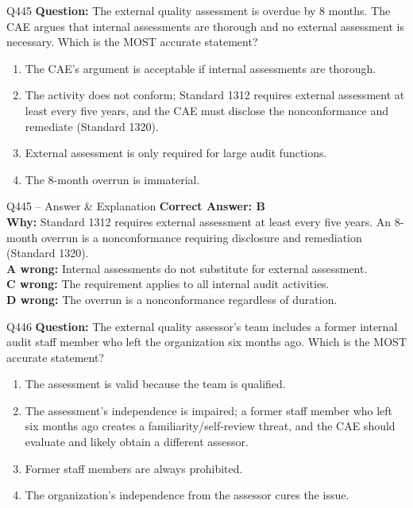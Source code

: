 \documentclass[aspectratio=169,10pt]{beamer}
\begin{document}
	\begin{frame}[t]{Q445}
		\small
		\textbf{Question:} The external quality assessment is overdue by 8 months. The CAE argues that internal assessments are thorough and no external assessment is necessary. Which is the MOST accurate statement?
		\begin{enumerate}[label=\Alph*.,itemsep=1pt,topsep=2pt]
			\item The CAE's argument is acceptable if internal assessments are thorough.
			\item The activity does not conform; Standard 1312 requires external assessment at least every five years, and the CAE must disclose the nonconformance and remediate (Standard 1320).
			\item External assessment is only required for large audit functions.
			\item The 8-month overrun is immaterial.
		\end{enumerate}
	\end{frame}
	
	\begin{frame}[t]{Q445 -- Answer \& Explanation}
		\small
		\textbf{Correct Answer: B} \\[4pt]
		\textbf{Why:} Standard 1312 requires external assessment at least every five years. An 8-month overrun is a nonconformance requiring disclosure and remediation (Standard 1320). \\[4pt]
		\textbf{A wrong:} Internal assessments do not substitute for external assessment. \\[2pt]
		\textbf{C wrong:} The requirement applies to all internal audit activities. \\[2pt]
		\textbf{D wrong:} The overrun is a nonconformance regardless of duration.
	\end{frame}
	
	\begin{frame}[t]{Q446}
		\small
		\textbf{Question:} The external quality assessor's team includes a former internal audit staff member who left the organization six months ago. Which is the MOST accurate statement?
		\begin{enumerate}[label=\Alph*.,itemsep=1pt,topsep=2pt]
			\item The assessment is valid because the team is qualified.
			\item The assessment's independence is impaired; a former staff member who left six months ago creates a familiarity/self-review threat, and the CAE should evaluate and likely obtain a different assessor.
			\item Former staff members are always prohibited.
			\item The organization's independence from the assessor cures the issue.
		\end{enumerate}
	\end{frame}
	
\end{document}
